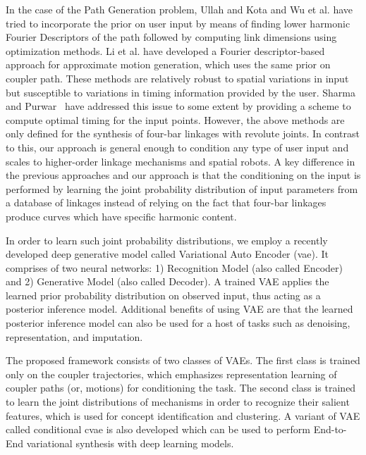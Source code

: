 In the case of the Path Generation problem, Ullah and Kota \cite{ullah1997} and Wu et al.\cite{wu2011} have tried to incorporate the prior on user input by means of finding lower harmonic Fourier Descriptors of the path followed by computing link dimensions using optimization methods.
Li et al.\cite{li2016} have developed a Fourier descriptor-based approach for approximate motion generation, which uses the same prior on coupler path.
These methods are relatively robust to spatial variations in input but susceptible to variations in timing information provided by the user.
Sharma and Purwar~\cite{sharma2019optimal} have addressed this issue to some extent by providing a scheme to compute optimal timing for the input points.
However, the above methods are only defined for the synthesis of four-bar linkages with revolute joints.
In contrast to this, our approach is general enough to condition any type of user input and scales to higher-order linkage mechanisms and spatial robots. A key difference in the previous approaches and our approach is that the conditioning on the input is performed by learning the joint probability distribution of input parameters from a database of linkages instead of relying on the fact that four-bar linkages produce curves which have specific harmonic content.

In order to learn such joint probability distributions, we employ a recently developed deep generative model called Variational Auto Encoder (\ac{vae}). It comprises of two neural networks: 1) Recognition Model (also called Encoder) and 2) Generative Model (also called Decoder).
A trained VAE applies the learned prior probability distribution on observed input, thus acting as a posterior inference model. Additional benefits of using VAE are that the learned posterior inference model can also be used for a host of tasks such as denoising, representation, and imputation.

The proposed framework consists of two classes of VAEs.
The first class is trained only on the coupler trajectories, which emphasizes representation learning of coupler paths (or, motions) for conditioning the task.
The second class is trained to learn the joint distributions of mechanisms in order to recognize their salient features, which is used for concept identification and clustering.
A variant of VAE called conditional \ac{cvae} is also developed which can be used to perform End-to-End variational synthesis with deep learning models.

